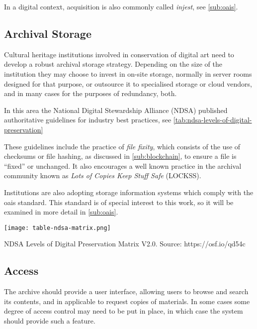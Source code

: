 In a digital context, acquisition is also commonly called \emph{injest}, see \autoref{sub:oais}.

\subsection{Archival Storage}

Cultural heritage institutions involved in conservation of digital art need to develop a robust archival storage strategy. Depending on the size of the institution they may choose to invest in on-site storage, normally in server rooms designed for that purpose, or outsource it to specialised storage or cloud vendors, and in many cases for the purposes of redundancy, both.

In this area the National Digital Stewardship Alliance (NDSA) published authoritative guidelines for industry best practices, see \autoref{tab:ndsa-levels-of-digital-preservation}

These guidelines include the practice of \emph{file fixity}, which consists of the use of checksums or file hashing, as discussed in \autoref{sub:blockchain}, to ensure a file is ``fixed'' or unchanged. It also encourages a well known practice in the archival community known as \emph{Lots of Copies Keep Stuff Safe} (LOCKSS).

Institutions are also adopting storage information systems which comply with the \gls{oais} standard. This standard is of special interest to this work, so it will be examined in more detail in \autoref{sub:oais}.

\begin{table}[h!]
\centering
\captionsetup{type=table} %
\texttt{[image: table-ndsa-matrix.png]} %
\caption[NDSA Levels of Digital Preservation Matrix V2.0]{NDSA Levels of Digital Preservation Matrix V2.0. Source: https://osf.io/qd54c}
\label{tab:ndsa-levels-of-digital-preservation}
\end{table}


\subsection{Access}

The archive should provide a user interface, allowing users to browse and search its contents, and in applicable to request copies of materials. In some cases some degree of access control may need to be put in place, in which case the system should provide such a feature. \cite{nationallibraryofaustraliaGuidelinesPreservationDigital2003}

